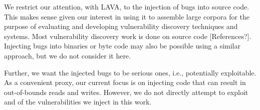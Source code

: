 
We restrict our attention, with LAVA, to the injection of bugs into source code.
This makes sense given our interest in using it to assemble large corpora for the purpose of evaluating and developing vulnerability discovery techniques and systems.
Most vulnerability discovery work is done on source code [References?].
Injecting bugs into binaries or byte code may also be possible using a similar approach, but we do not consider it here.

Further, we want the injected bugs to be serious ones, i.e., potentially exploitable.
As a convenient proxy, our current focus is on injecting code that can result in out-of-bounds reads and writes.  
However, we do not directly attempt to exploit and of the vulnerabilities we inject in this work.




